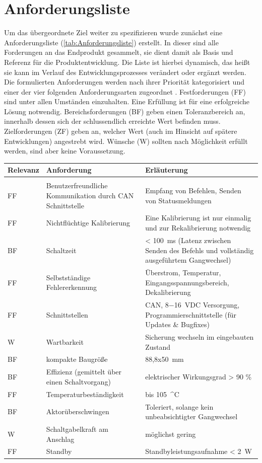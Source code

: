 \section{Anforderungsliste}
Um das übergeordnete Ziel weiter zu spezifizieren wurde zunächst eine Anforderungsliste (\autoref{tab:Anforderungsliste}) erstellt. In dieser sind alle Forderungen an das Endprodukt gesammelt, sie dient damit als Basis und Referenz für die Produktentwicklung. Die Liste ist hierbei dynamisch, das heißt sie kann im Verlauf des Entwicklungsprozesses verändert oder ergänzt werden.  Die formulierten Anforderungen werden nach ihrer Priorität kategorisiert und einer der vier folgenden Anforderungsarten zugeordnet \cite[S.189]{2013a}. Festforderungen (FF) sind unter allen Umständen einzuhalten. Eine Erfüllung ist für eine erfolgreiche Lösung notwendig.
Bereichsforderungen (BF) geben einen Toleranzbereich an, innerhalb dessen sich der schlussendlich erreichte Wert befinden muss.
Zielforderungen (ZF) geben an, welcher Wert (auch im Hinsicht auf spätere Entwicklungen) angestrebt wird.
Wünsche (W) sollten nach Möglichkeit erfüllt werden, sind aber keine Voraussetzung. 

\begin{table}[h]
	\centering
		\begin{tabular}{l|p{7cm}|p{7cm}}
			\textbf{Relevanz} & \textbf{Anforderung} & \textbf{Erläuterung} \\ \hline
			& &\\
			FF & Benutzerfreundliche Kommunikation durch CAN Schnittstelle & Empfang von Befehlen, Senden von Statusmeldungen \\ \hline
			FF & Nichtflüchtige Kalibrierung & Eine Kalibrierung ist nur einmalig und zur Rekalibrierung notwendig \\ \hline
			BF & Schaltzeit & < \SI{100}{ms} (Latenz zwischen Senden des Befehls und vollständig ausgeführtem Gangwechsel) \\ \hline
			FF & Selbstständige Fehlererkennung & Überstrom, Temperatur, Eingangsspannungsbereich, Dekalibrierung \\ \hline
			FF & Schnittstellen & CAN, \SI{8-16}{VDC} Versorgung, Programmierschnittstelle (für Updates \& Bugfixes) \\ \hline
			W & Wartbarkeit & Sicherung wechseln im eingebauten Zustand \\ \hline
			BF & kompakte Baugröße & 88,8x\SI{50}{mm}\\ \hline
			BF & Effizienz (gemittelt über einen Schaltvorgang) & elektrischer Wirkungsgrad > 90 \% \\ \hline
			FF & Temperaturbeständigkeit & bis \SI{105}{^\circ C} \\ \hline
			BF & Aktorüberschwingen & Toleriert, solange kein unbeabsichtigter Gangwechsel \\ \hline
			W & Schaltgabelkraft am Anschlag & möglichst gering \\ \hline
			FF & Standby & Standbyleistungsaufnahme < \SI{2}{W} \\ \hline
		\end{tabular}
	
	\label{tab:Anforderungsliste}
\end{table}

